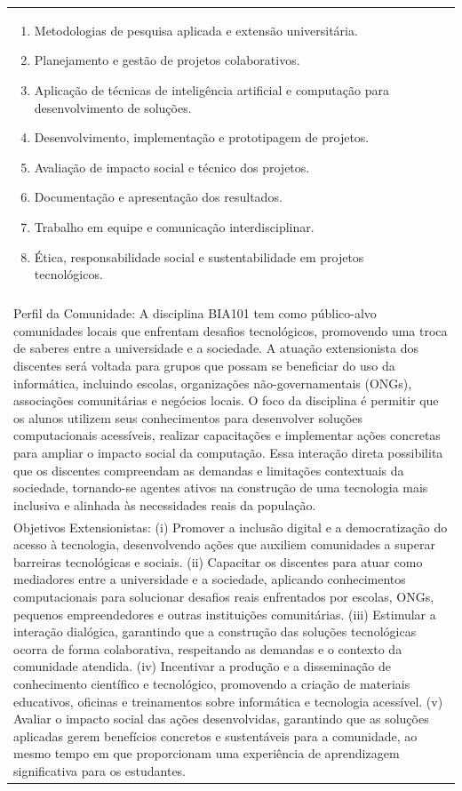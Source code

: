 \documentclass[11pt]{article}
\begin{document}
\begin{center}
\begin{longtable}{|p{4cm}|p{4cm}|p{4cm}|p{4cm}|}
{\begin{enumerate}
\item Metodologias de pesquisa aplicada e extensão universitária.
\item Planejamento e gestão de projetos colaborativos.
\item Aplicação de técnicas de inteligência artificial e computação para desenvolvimento de soluções.
\item Desenvolvimento, implementação e prototipagem de projetos.
\item Avaliação de impacto social e técnico dos projetos.
\item Documentação e apresentação dos resultados.
\item Trabalho em equipe e comunicação interdisciplinar.
\item Ética, responsabilidade social e sustentabilidade em projetos tecnológicos.\end{enumerate}}\\
\multicolumn{4}{|p{16cm}|}{}\\
\multicolumn{4}{|p{16cm}|}{Perfil da Comunidade: A disciplina BIA101 tem como público-alvo comunidades locais que enfrentam desafios tecnológicos, promovendo uma troca de saberes entre a universidade e a sociedade. A atuação extensionista dos discentes será voltada para grupos que possam se beneficiar do uso da informática, incluindo escolas, organizações não-governamentais (ONGs), associações comunitárias e negócios locais. O foco da disciplina é permitir que os alunos utilizem seus conhecimentos para desenvolver soluções computacionais acessíveis, realizar capacitações e implementar ações concretas para ampliar o impacto social da computação. Essa interação direta possibilita que os discentes compreendam as demandas e limitações contextuais da sociedade, tornando-se agentes ativos na construção de uma tecnologia mais inclusiva e alinhada às necessidades reais da população.}\\
\multicolumn{4}{|p{16cm}|}{Objetivos Extensionistas: (i) Promover a inclusão digital e a democratização do acesso à tecnologia, desenvolvendo ações que auxiliem comunidades a superar barreiras tecnológicas e sociais. (ii) Capacitar os discentes para atuar como mediadores entre a universidade e a sociedade, aplicando conhecimentos computacionais para solucionar desafios reais enfrentados por escolas, ONGs, pequenos empreendedores e outras instituições comunitárias. (iii) Estimular a interação dialógica, garantindo que a construção das soluções tecnológicas ocorra de forma colaborativa, respeitando as demandas e o contexto da comunidade atendida. (iv) Incentivar a produção e a disseminação de conhecimento científico e tecnológico, promovendo a criação de materiais educativos, oficinas e treinamentos sobre informática e tecnologia acessível. (v) Avaliar o impacto social das ações desenvolvidas, garantindo que as soluções aplicadas gerem benefícios concretos e sustentáveis para a comunidade, ao mesmo tempo em que proporcionam uma experiência de aprendizagem significativa para os estudantes.}\\

\end{longtable}
\end{center}
\end{document}
